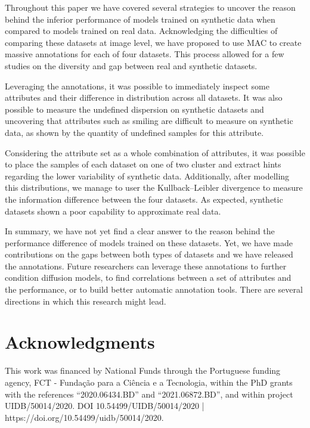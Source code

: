\documentclass[a4paper, 10pt, conference]{ieeeconf}      %
\begin{document}
Throughout this paper we have covered several strategies to uncover the reason behind the inferior performance of models trained on synthetic data when compared to models trained on real data. Acknowledging the difficulties of comparing these datasets at image level, we have proposed to use MAC to create massive annotations for each of four datasets. This process allowed for a few studies on the diversity and gap between real and synthetic datasets. 

Leveraging the annotations, it was possible to immediately inspect some attributes and their difference in distribution across all datasets. It was also possible to measure the undefined dispersion on synthetic datasets and uncovering that attributes such as smiling are difficult to measure on synthetic data, as shown by the quantity of undefined samples for this attribute. 

Considering the attribute set as a whole combination of attributes, it was possible to place the samples of each dataset on one of two cluster and extract hints regarding the lower variability of synthetic data. Additionally, after modelling this distributions, we manage to user the Kullback–Leibler divergence to measure the information difference between the four datasets. As expected, synthetic datasets shown a poor capability to approximate real data.

In summary, we have not yet find a clear answer to the reason behind the performance difference of models trained on these datasets. Yet, we have made contributions on the gaps between both types of datasets and we have released the annotations. Future researchers can leverage these annotations to further condition diffusion models, to find correlations between a set of attributes and the performance, or to build better automatic annotation tools. There are several directions in which this research might lead.


 


\section{Acknowledgments}
This work was financed by National Funds through the Portuguese funding agency, FCT - Fundação para a Ciência e a Tecnologia, within the PhD grants with the references ``2020.06434.BD'' and ``2021.06872.BD'', and within project UIDB/50014/2020.
DOI 10.54499/UIDB/50014/2020 | https://doi.org/10.54499/uidb/50014/2020.

{\small


}
\end{document}
